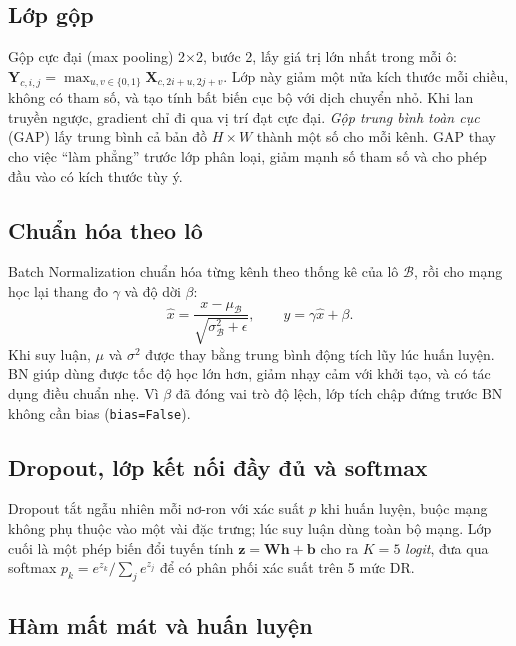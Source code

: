 \subsection{Lớp gộp}

Gộp cực đại (max pooling) 2×2, bước 2, lấy giá trị lớn nhất trong mỗi ô: $\mathbf Y_{c,i,j}=\max_{u,v\in\{0,1\}}\mathbf X_{c,2i+u,2j+v}$. Lớp này giảm một nửa kích thước mỗi chiều, không có tham số, và tạo tính bất biến cục bộ với dịch chuyển nhỏ. Khi lan truyền ngược, gradient chỉ đi qua vị trí đạt cực đại. \emph{Gộp trung bình toàn cục} (GAP) lấy trung bình cả bản đồ $H\times W$ thành một số cho mỗi kênh. GAP thay cho việc ``làm phẳng'' trước lớp phân loại, giảm mạnh số tham số và cho phép đầu vào có kích thước tùy ý.

\subsection{Chuẩn hóa theo lô}

Batch Normalization \cite{ioffe2015} chuẩn hóa từng kênh theo thống kê của lô $\mathcal B$, rồi cho mạng học lại thang đo $\gamma$ và độ dời $\beta$:
\begin{equation}
\hat x = \frac{x - \mu_{\mathcal B}}{\sqrt{\sigma^2_{\mathcal B}+\epsilon}},\qquad y = \gamma\hat x + \beta .
\label{eq:bn}
\end{equation}
Khi suy luận, $\mu$ và $\sigma^2$ được thay bằng trung bình động tích lũy lúc huấn luyện. BN giúp dùng được tốc độ học lớn hơn, giảm nhạy cảm với khởi tạo, và có tác dụng điều chuẩn nhẹ. Vì $\beta$ đã đóng vai trò độ lệch, lớp tích chập đứng trước BN không cần bias (\texttt{bias=False}).

\subsection{Dropout, lớp kết nối đầy đủ và softmax}

Dropout \cite{srivastava2014} tắt ngẫu nhiên mỗi nơ-ron với xác suất $p$ khi huấn luyện, buộc mạng không phụ thuộc vào một vài đặc trưng; lúc suy luận dùng toàn bộ mạng. Lớp cuối là một phép biến đổi tuyến tính $\mathbf z = \mathbf W\mathbf h + \mathbf b$ cho ra $K=5$ \emph{logit}, đưa qua softmax $p_k = e^{z_k}/\sum_j e^{z_j}$ để có phân phối xác suất trên 5 mức DR.

\subsection{Hàm mất mát và huấn luyện}

